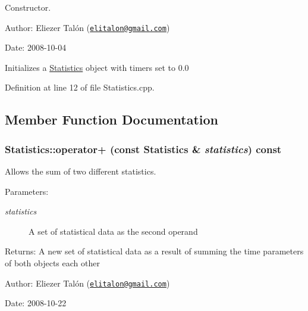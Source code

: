 Constructor. 

\begin{Desc}
\item[Author:]Eliezer Talón (\href{mailto:elitalon@gmail.com}{\tt elitalon@gmail.com}) \end{Desc}
\begin{Desc}
\item[Date:]2008-10-04\end{Desc}
Initializes a \hyperlink{class_statistics}{Statistics} object with timers set to 0.0 

Definition at line 12 of file Statistics.cpp.

\subsection{Member Function Documentation}
\hypertarget{class_statistics_cb07c98a63e07fdb1476ffb282b84676}{
\subsubsection[operator+]{ Statistics::operator+ (const {\bf Statistics} \& {\em statistics}) const}}
\label{class_statistics_cb07c98a63e07fdb1476ffb282b84676}


Allows the sum of two different statistics. 

\begin{Desc}
\item[Parameters:]
\begin{description}
\item[{\em statistics}]A set of statistical data as the second operand\end{description}
\end{Desc}
\begin{Desc}
\item[Returns:]A new set of statistical data as a result of summing the time parameters of both objects each other\end{Desc}
\begin{Desc}
\item[Author:]Eliezer Talón (\href{mailto:elitalon@gmail.com}{\tt elitalon@gmail.com}) \end{Desc}
\begin{Desc}
\item[Date:]2008-10-22 \end{Desc}


